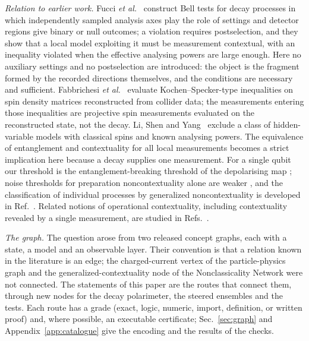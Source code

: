 \emph{Relation to earlier work.} Fucci \emph{et al.}~\cite{fucci2026} construct Bell tests for decay processes in which independently sampled analysis axes play the role of settings and detector regions give binary or null outcomes; a violation requires postselection, and they show that a local model exploiting it must be measurement contextual, with an inequality violated when the effective analysing powers are large enough. Here no auxiliary settings and no postselection are introduced: the object is the fragment formed by the recorded directions themselves, and the conditions are necessary and sufficient. Fabbrichesi \emph{et al.}~\cite{fabbrichesi2025pra,fabbrichesi2025prd} evaluate Kochen--Specker-type inequalities on spin density matrices reconstructed from collider data; the measurements entering those inequalities are projective spin measurements evaluated on the reconstructed state, not the decay. Li, Shen and Yang~\cite{li2024} exclude a class of hidden-variable models with classical spins and known analysing powers. The equivalence of entanglement and contextuality for all local measurements \cite{plavala2024} becomes a strict implication here because a decay supplies one measurement. For a single qubit our threshold is the entanglement-breaking threshold of the depolarising map \cite{horodeckiEB2003,ruskai2003}; noise thresholds for preparation noncontextuality alone are weaker \cite{marvian2020}, and the classification of individual processes by generalized noncontextuality is developed in Ref.~\cite{zhang2025prx}. Related notions of operational contextuality, including contextuality revealed by a single measurement, are studied in Refs.~\cite{jokinen2024,jokinen2026}.

\emph{The graph.} The question arose from two released concept graphs, each with a state, a model and an observable layer. Their convention is that a relation known in the literature is an edge; the charged-current vertex of the particle-physics graph \cite{genhep} and the generalized-contextuality node of the Nonclassicality Network \cite{gengpt} were not connected. The statements of this paper are the routes that connect them, through new nodes for the decay polarimeter, the steered ensembles and the tests. Each route has a grade (exact, logic, numeric, import, definition, or written proof) and, where possible, an executable certificate; Sec.~\ref{sec:graph} and Appendix~\ref{app:catalogue} give the encoding and the results of the checks.
